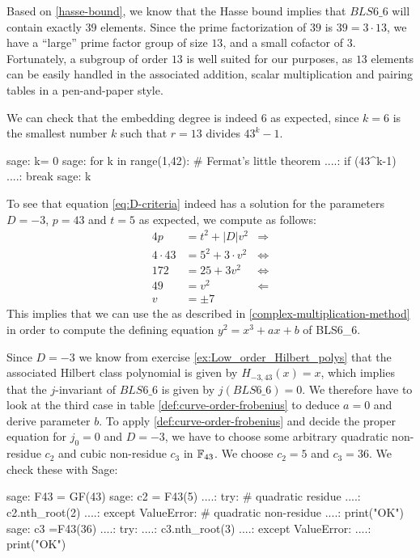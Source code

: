 Based on \ref{hasse-bound}, we know that the Hasse bound implies that $BLS6\_6$ will contain exactly $39$ elements. Since the prime factorization of $39$ is $39=3\cdot 13$, we have a ``large'' prime factor group of size $13$, and a small cofactor of $3$. Fortunately, a subgroup of order $13$ is well suited for our purposes, as $13$ elements can be easily handled in the associated addition, scalar multiplication and pairing tables in a pen-and-paper style. 

We can check that the embedding degree is indeed $6$ as expected, since $k = 6$ is the smallest number $k$ such that $r=13$ divides $43^k-1$. 
\begin{sagecommandline}
sage: k= 0
sage: for k in range(1,42): # Fermat's little theorem
....:     if (43^k-1)%
....:         break
sage: k
\end{sagecommandline}

To see that equation \ref{eq:D-criteria} indeed has a solution for the parameters $D=-3$, $p=43$ and $t=5$ as expected, we compute as follows:  
\begin{align*}
4p & = t^2 + |D|v^2 & \Rightarrow \\ 
4\cdot 43 & = 5^2 + 3\cdot v^2 & \Leftrightarrow \\ 
172 & = 25 + 3 v^2 & \Leftrightarrow \\ 
49 & = v^2 & \Leftarrow \\
v & = \pm 7
\end{align*}
This implies that we can use the  as described in \ref{complex-multiplication-method} in order to compute the defining equation $y^2=x^3 + ax + b$ of BLS6\_6. 

Since $D=-3$ we know from exercise \ref{ex:Low_order_Hilbert_polys} that the associated Hilbert class polynomial is given by $H_{-3,43}(x) = x$, which implies that the $j$-invariant of $BLS6\_6$ is given by $j(BLS6\_6)=0$. We therefore have to look at the third case in table \ref{def:curve-order-frobenius} to deduce $a=0$ and derive parameter $b$. To apply \ref{def:curve-order-frobenius} and decide the proper equation for $j_0=0$ and $D=-3$, we have to choose some arbitrary quadratic non-residue $c_2$ and cubic non-residue $c_3$ in $\mathbb{F}_{43}$. We choose $c_2 =5$ and $c_3=36$. We check these with Sage:
\begin{sagecommandline}
sage: F43 = GF(43)
sage: c2 = F43(5)
....: try: # quadratic residue
....:     c2.nth_root(2)
....: except ValueError: # quadratic non-residue
....:     print("OK") 
sage: c3 =F43(36)
....: try:
....:     c3.nth_root(3)
....: except ValueError:
....:     print("OK") 
\end{sagecommandline} 

